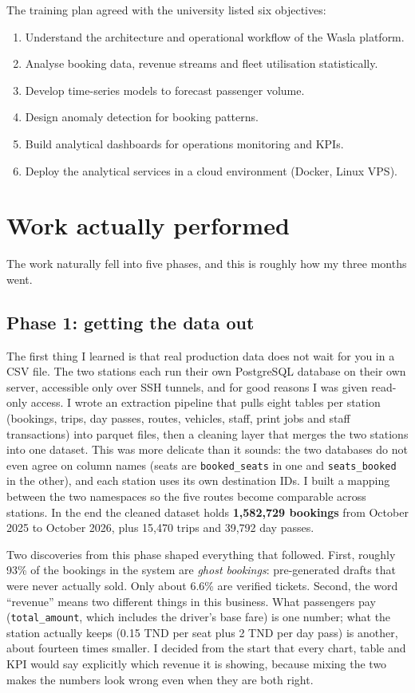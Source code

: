 \documentclass[11pt,a4paper]{article}
\begin{document}
The training plan agreed with the university listed six objectives:

\begin{enumerate}
  \item Understand the architecture and operational workflow of the Wasla platform.
  \item Analyse booking data, revenue streams and fleet utilisation statistically.
  \item Develop time-series models to forecast passenger volume.
  \item Design anomaly detection for booking patterns.
  \item Build analytical dashboards for operations monitoring and KPIs.
  \item Deploy the analytical services in a cloud environment (Docker, Linux VPS).
\end{enumerate}

\section{Work actually performed}

The work naturally fell into five phases, and this is roughly how my three months
went.

\subsection*{Phase 1: getting the data out}

The first thing I learned is that real production data does not wait for you in a CSV
file. The two stations each run their own PostgreSQL database on their own server,
accessible only over SSH tunnels, and for good reasons I was given read-only access.
I wrote an extraction pipeline that pulls eight tables per station (bookings, trips,
day passes, routes, vehicles, staff, print jobs and staff transactions) into parquet
files, then a cleaning layer that merges the two stations into one dataset. This was
more delicate than it sounds: the two databases do not even agree on column names
(seats are \texttt{booked\_seats} in one and \texttt{seats\_booked} in the other),
and each station uses its own destination IDs. I built a mapping between the two
namespaces so the five routes become comparable across stations. In the end the
cleaned dataset holds \textbf{1,582,729 bookings} from October 2025 to October 2026,
plus 15,470 trips and 39,792 day passes.

Two discoveries from this phase shaped everything that followed. First, roughly 93\%
of the bookings in the system are \emph{ghost bookings}: pre-generated drafts that
were never actually sold. Only about 6.6\% are verified tickets. Second, the word
``revenue'' means two different things in this business. What passengers pay
(\texttt{total\_amount}, which includes the driver's base fare) is one number; what
the station actually keeps (0.15 TND per seat plus 2 TND per day pass) is another,
about fourteen times smaller. I decided from the start that every chart, table and
KPI would say explicitly which revenue it is showing, because mixing the two makes
the numbers look wrong even when they are both right.
\end{document}
